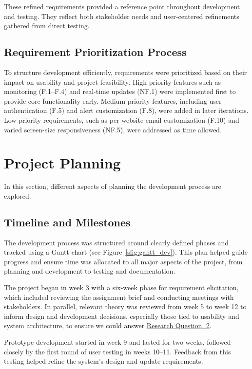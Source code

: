 These refined requirements provided a reference point throughout development and testing. They reflect both stakeholder needs and user-centered refinements gathered from direct testing.

\subsection{Requirement Prioritization Process}
\label{subsec:req_prio_process}

To structure development efficiently, requirements were prioritized based on their impact on usability and project feasibility. High-priority features such as monitoring (F.1–F.4) and real-time updates (NF.1) were implemented first to provide core functionality early. Medium-priority features, including user authentication (F.5) and alert customization (F.8), were added in later iterations. Low-priority requirements, such as per-website email customization (F.10) and varied screen-size responsiveness (NF.5), were addressed as time allowed.


\section{Project Planning}
In this section, different aspects of planning the development process are explored.

\subsection{Timeline and Milestones}
\label{subsec:timeline_and_milestones}

The development process was structured around clearly defined phases and tracked using a Gantt chart (see Figure~\ref{sfig:gantt_dev}). This plan helped guide progress and ensure time was allocated to all major aspects of the project, from planning and development to testing and documentation.

The project began in week 3 with a six-week phase for requirement elicitation, which included reviewing the assignment brief and conducting meetings with stakeholders. In parallel, relevant theory was reviewed from week 5 to week 12 to inform design and development decisions, especially those tied to usability and system architecture, to ensure we could answer \hyperref[subsec:RQ2]{Research Question. 2}.

Prototype development started in week 9 and lasted for two weeks, followed closely by the first round of user testing in weeks 10–11. Feedback from this testing helped refine the system’s design and update requirements.

